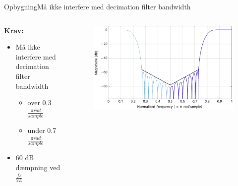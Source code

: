 \begin{frame}{Opbygning}{Må ikke interfere med decimation filter bandwidth}
\begin{columns}
  \begin{column}{0.4\textwidth}
\textbf{Krav:}
\begin{itemize}
\item Må ikke interfere med decimation filter bandwidth
\begin{itemize}
\item over 0.3 $\frac{\pi rad}{sample}$
\item under 0.7 $\frac{\pi rad}{sample}$
\end{itemize}
\item \alert{60 dB dæmpning ved $\frac{fs}{2L}$}
\end{itemize}
  \end{column}
  \begin{column}{0.6\textwidth}
\begin{figure}
	\centering
	\includegraphics[width=1\textwidth]{DecIntCompMirror}
\end{figure}
  \end{column}
\end{columns}
\end{frame}

